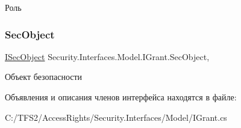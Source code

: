 Роль 

\mbox{\label{interface_security_1_1_interfaces_1_1_model_1_1_i_grant_af62c0154f06092a8ac1b4841af810c1b}} 
\subsubsection{\texorpdfstring{Sec\+Object}{SecObject}}
{\footnotesize\ttfamily \hyperlink{interface_security_1_1_interfaces_1_1_model_1_1_i_sec_object}{I\+Sec\+Object} Security.\+Interfaces.\+Model.\+I\+Grant.\+Sec\+Object\hspace{0.3cm}{\ttfamily [get]}, {\ttfamily [set]}}



Объект безопасности 



Объявления и описания членов интерфейса находятся в файле\+:\begin{DoxyCompactItemize}
\item 
C\+:/\+T\+F\+S2/\+Access\+Rights/\+Security.\+Interfaces/\+Model/I\+Grant.\+cs\end{DoxyCompactItemize}

